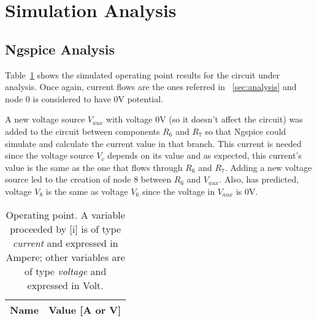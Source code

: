 \section{Simulation Analysis}
\label{sec:simulation}

\subsection{Ngspice Analysis}

Table~\ref{tab:op} shows the simulated operating point results for the circuit
under analysis. Once again, current flows are the ones referred in ~\ref{sec:analysis} and node 0 is considered to have 0V potential. \par
 A new voltage source $V_{aux}$ with voltage 0V (so it doesn't affect the circuit) was added to the circuit between components $R_6$ and $R_7$ so that Ngspice could simulate and calculate the current value in that branch. This current is needed since the voltage source $V_c$ depends on its value and as expected, this current's value is the same as the one that flows through $R_6$ and $R_7$. Adding a new voltage source led to the creation of node 8 between $R_6$ and $V_{aux}$. Also, has predicted, voltage $V_8$ is the same as voltage $V_6$ since the voltage in $V_{aux}$ is 0V.

\begin{table}[h]
  \centering
  \begin{tabular}{|l|r|}
    \hline    
    {\bf Name} & {\bf Value [A or V]} \\ \hline
    
  \end{tabular}
  \caption{Operating point. A variable proceeded by [i] is of type {\em current}
    and expressed in Ampere; other variables are of type {\it voltage} and expressed in
    Volt.}
  \label{tab:op}
\end{table}
\FloatBarrier

